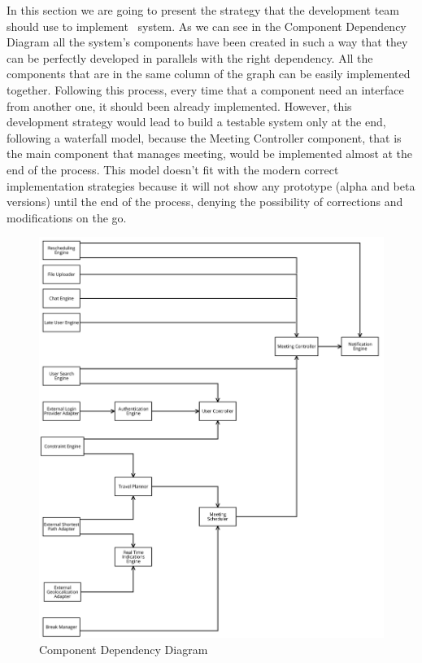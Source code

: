 In this section we are going to present the strategy that the development team should use to implement \projectname~system. As we can see in the Component Dependency Diagram all the system's components have been created in such a way that they can be perfectly developed in parallels with the right dependency. All the components that are in the same column of the graph can be easily implemented together. Following this process, every time that a component need an interface from another one, it should been already implemented. However, this development strategy would lead to build a testable system only at the end, following a waterfall model, because the Meeting Controller component, that is the main component that manages meeting, would be implemented almost at the end of the process. This model doesn't fit with the modern correct implementation strategies because it will not show any prototype (alpha and beta versions) until the end of the process, denying the possibility of corrections and modifications on the go.\\

\begin{figure}[!h]
	\centering\includegraphics[scale = 0.22]{Images/UMLDiagrams/DependencyDiagram.png}
	\caption{Component Dependency Diagram}
\end{figure}

